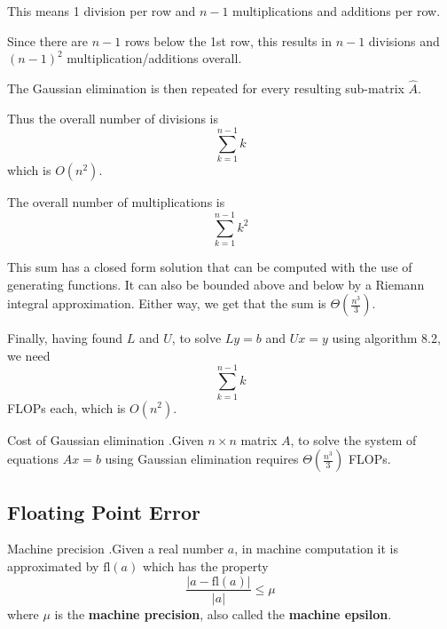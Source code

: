 \documentclass[12pt,letterpaper]{article}
\newcommand{\fl}{\mathrm{fl}}
\begin{document}
This means 1 division per row and $n-1$ multiplications and additions per row.

Since there are $n-1$ rows below the 1st row, this results in $n-1$ divisions and $(n-1)^2$ multiplication/additions overall.

The Gaussian elimination is then repeated for every resulting sub-matrix $\hat{A}$.

Thus the overall number of divisions is
\begin{equation}
	\sum_{k=1}^{n-1} k
\end{equation}
which is $O(n^2)$.

The overall number of multiplications is
\begin{equation}
	\sum_{k=1}^{n-1}k^2
\end{equation}

This sum has a closed form solution that can be computed with the use of generating functions. It can also be bounded above and below by a Riemann integral approximation. Either way, we get that the sum is $\Theta\left(\frac{n^3}{3}\right)$.

Finally, having found $L$ and $U$, to solve $Ly = b$ and $Ux = y$ using algorithm 8.2, we need
\begin{equation}
	\sum_{k=1}^{n-1} k
\end{equation}
FLOPs each, which is $O(n^2)$.

\begin{theo}{Cost of Gaussian elimination}
.Given $n \times n$ matrix $A$, to solve the system of equations $Ax = b$ using Gaussian elimination requires $\Theta\left(\frac{n^3}{3}\right)$ FLOPs.

\label{thm:gauss_cost}
\end{theo}

\subsection{Floating Point Error}

\begin{defn}{Machine precision}
.Given a real number $a$, in machine computation it is approximated by $\fl(a)$ which has the property
\begin{equation}
	\frac{\left| a - \fl(a) \right|}{\left|a\right|} \leq \mu
\end{equation}
where $\mu$ is the \textbf{machine precision}, also called the \textbf{machine epsilon}.

\label{defn:machine_precision}
\end{defn}
\end{document}
